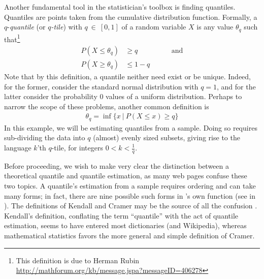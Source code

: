Another fundamental tool in the statistician's toolbox is finding quantiles.  Quantiles are points taken from the cumulative distribution function.  Formally, a $q$-\emph{quantile} (or \emph{$q$-tile}) with $q~\in~[0,1]$ of a random variable $X$ is any value $\theta_q$ such that\footnote{This definition is due to Herman Rubin \url{http://mathforum.org/kb/message.jspa?messageID=406278}}
\begin{align*}
P(X\leq \theta_q) &\geq q\hspace{2cm}\text{and}\\
P(X\geq \theta_q) &\leq 1-q
\end{align*}
Note that by this definition, a quantile neither need exist or be unique.  Indeed, for the former, consider the standard normal distribution with $q=1$, and for the latter consider the probability 0 values of a uniform distribution.  Perhaps to narrow the scope of these problems, another common definition is
\begin{align*}
\theta_q = \inf \{x\ |\ P(X\leq x) \geq q\}
\end{align*}
In this example, we will be estimating quantiles from a sample.  Doing so requires sub-dividing the data into $q$ (almost) evenly sized subsets, giving rise to the language $k$'th $q$-tile, for integers $0<k<\frac{1}{q}$.

Before proceeding, we wish to make very clear the distinction between a theoretical quantile and quantile estimation, as many web pages confuse these two topics.  A quantile's estimation from a sample requires ordering and can take many forms; in fact, there are nine possible such forms in 's own  function (see  in ).  The definitions of Kendall and Cramer may be the source of all the confusion \citep{quantilemess}.  Kendall's definition, conflating the term ``quantile'' with the act of quantile estimation, seems to have entered most dictionaries (and Wikipedia), whereas mathematical statistics favors the more general and simple definition of Cramer.

